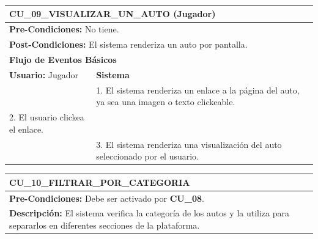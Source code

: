 \begin{center}
  \begin{tabular}{| p{7.5cm} | p{7.5cm} |}
    \hline
    \multicolumn{2}{|p{15cm}|}{\textbf{CU\_09\_VISUALIZAR\_UN\_AUTO} (Jugador)} \\ \hline
    \multicolumn{2}{|p{15cm}|}{\textbf{Pre-Condiciones:} No tiene.} \\ \hline
    \multicolumn{2}{|p{15cm}|}{\textbf{Post-Condiciones:} El sistema renderiza un auto por pantalla.} \\ \hline
    \multicolumn{2}{|p{7.5cm}|}{\textbf{Flujo de Eventos Básicos}} \\ \hline
    \multicolumn{1}{|p{7.5cm}|}{\textbf{Usuario:} Jugador} & \multicolumn{1}{|p{7.5cm}|}{\textbf{Sistema}} \\ \hline
    
    \multicolumn{1}{|p{7.5cm}|}{} & 
    \multicolumn{1}{|p{7.5cm}|}{1. El sistema renderiza un enlace a la página del auto, ya sea una imagen o texto clickeable.}\\ \hline
    
    \multicolumn{1}{|p{7.5cm}|}{2. El usuario clickea el enlace.}& 
    \multicolumn{1}{|p{7.5cm}|}{}\\ \hline
    
    \multicolumn{1}{|p{7.5cm}|}{} & 
    \multicolumn{1}{|p{7.5cm}|}{3. El sistema renderiza una visualización del auto seleccionado por el usuario.}\\ \hline
  \end{tabular}
  
  \label{table:usecase:9}
\end{center}

\begin{center}
  \begin{tabular}{| p{7.5cm} | p{7.5cm} |}
    \hline
    \multicolumn{2}{|p{15cm}|}{\textbf{CU\_10\_FILTRAR\_POR\_CATEGORIA}} \\ \hline
    \multicolumn{2}{|p{15cm}|}{\textbf{Pre-Condiciones:} Debe ser activado por \textbf{CU\_08}.} \\ \hline
    \multicolumn{2}{|p{15cm}|}{\textbf{Descripción:} El sistema verifica la categoría de los autos y la utiliza para separarlos en diferentes secciones de la plataforma.} \\
    \hline
  \end{tabular}
  
  \label{table:usecase:10}
\end{center}

